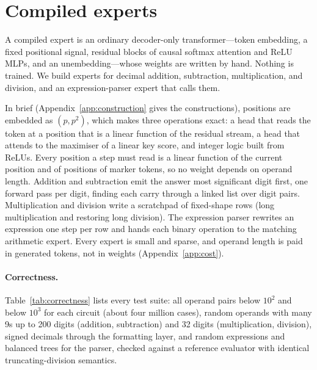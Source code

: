 \documentclass[10pt]{article}
\newcommand{\pending}[1]{{\color{red}\textbf{[#1]}}}
\begin{document}
\section{Compiled experts}
\label{sec:compiled}

A compiled expert is an ordinary decoder-only transformer---token embedding, a fixed
positional signal, residual blocks of causal softmax attention and ReLU MLPs, and an
unembedding---whose weights are written by hand. Nothing is trained. We build experts for
decimal addition, subtraction, multiplication, and division, and an expression-parser expert
that calls them.

In brief (Appendix~\ref{app:construction} gives the constructions), positions are embedded as
$(p, p^2)$, which makes three operations exact: a head that reads the token at a position that
is a linear function of the residual stream, a head that attends to the maximiser of a linear
key score, and integer logic built from ReLUs. Every position a step must read is a linear
function of the current position and of positions of marker tokens, so no weight depends on
operand length. Addition and subtraction emit the answer most significant digit first, one
forward pass per digit, finding each carry through a linked list over digit pairs.
Multiplication and division write a scratchpad of fixed-shape rows (long multiplication and
restoring long division). The expression parser rewrites an expression one step per row and
hands each binary operation to the matching arithmetic expert. Every expert is small and sparse,
and operand length is paid in generated tokens, not in weights (Appendix~\ref{app:cost}).
\label{sec:compiled_results}

\paragraph{Correctness.} Table~\ref{tab:correctness} lists every test suite: all operand pairs
below $10^2$ and below $10^3$ for each circuit (about four million cases), random operands with many 9s up to 200
digits (addition, subtraction) and 32 digits (multiplication, division), signed decimals through
the formatting layer, and random expressions and balanced trees for the parser, checked against
a reference evaluator with identical truncating-division semantics.
\begin{table}[t]
\centering\small
\caption{Correctness of the compiled experts. Every case is compared exactly with Python
integers, \texttt{Decimal}, or the reference expression evaluator.}
\label{tab:correctness}
\IfFileExists{tables/track_a_correctness.tex}{}{\pending{table}}
\end{table}
\end{document}
